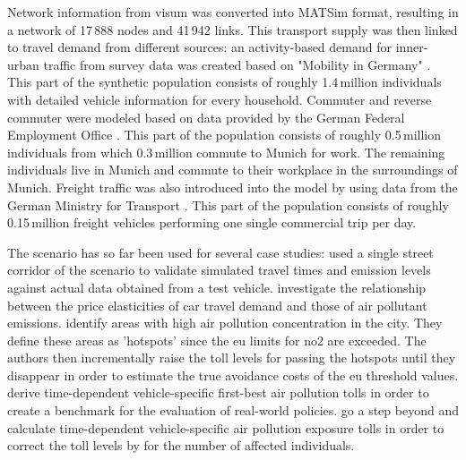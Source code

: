 Network information from \acrshort{visum} was converted into MATSim format, resulting in a network of 17\,888 nodes and 41\,942 links.
%
This transport supply was then linked to travel demand from different sources: an activity-based demand for inner-urban traffic from survey data was created based on "Mobility in Germany" \citep[MiD 2002,][]{FollmerEtAl_TechRep_infasDIW_2004}. This part of the synthetic population consists of roughly 1.4\,million individuals with detailed vehicle information for every household.
%
Commuter and reverse commuter were modeled based on data provided by the German Federal Employment Office \citep{BoehmeEigenhueller_TechRep_IAB_2006}. This part of the population consists of roughly 0.5\,million individuals from which 0.3\,million commute to Munich for work. The remaining individuals live in Munich and commute to their workplace in the surroundings of Munich.
%
Freight traffic was also introduced into the model by using data from the German Ministry for Transport \citep{ITBBVU_TechRep_2007}. This part of the population consists of roughly 0.15\,million freight vehicles performing one single commercial trip per day.

The scenario has so far been used for several case studies:
%
\citet{HuelsmannEtAl_LAS_2011} used a single street corridor of the scenario to validate simulated travel times and emission levels against actual data obtained from a test vehicle.
%
\citet{KickhoeferEtAl_VanoutriveVerhetsel_2013} investigate the relationship between the price elasticities of car travel demand and those of air pollutant emissions.
%
\citet{HuelsmannEtAl_GerikeEtAl_2013} identify areas with high air pollution concentration in the city. They define these areas as 'hotspots' since the \gls{eu} limits for \gls{no2} are exceeded. The authors then incrementally raise the toll levels for passing the hotspots until they disappear in order to estimate the true avoidance costs of the \gls{eu} threshold values.
%
\citet{KickhoeferNagel2012EmissionInternalization} derive time-dependent vehicle-specific first-best air pollution tolls in order to create a benchmark for the evaluation of real-world policies.
%
\citet{KickhoeferKern_MobilTUM_2014} go a step beyond and calculate time-dependent vehicle-specific air pollution exposure tolls in order to correct the toll levels by \citet{KickhoeferNagel2012EmissionInternalization} for the number of affected individuals.



